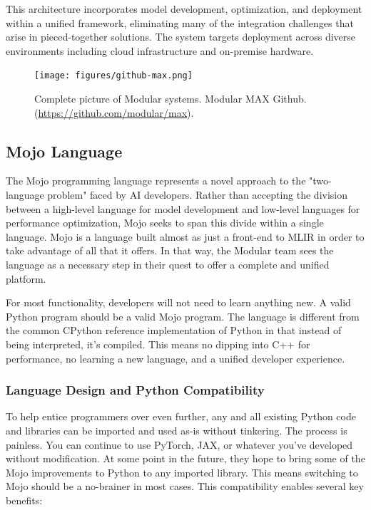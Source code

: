 \documentclass[manuscript,screen,review,format=acmsmall]{acmart}
\begin{document}
This architecture incorporates model development, optimization, and deployment within a unified framework, eliminating many of the integration challenges that arise in pieced-together solutions. The system targets deployment across diverse environments including cloud infrastructure and on-premise hardware.

\begin{figure}[h]
  \centering
  \texttt{[image: figures/github-max.png]}
  \caption{Complete picture of Modular systems.
    Modular MAX Github. (\url{https://github.com/modular/max}).}
  \label{figure:maxgood}
\end{figure}

\subsection{Mojo Language}

The Mojo programming language represents a novel approach to the "two-language problem" faced by AI developers. Rather than accepting the division between a high-level language for model development and low-level languages for performance optimization, Mojo seeks to span this divide within a single language. Mojo is a language built almost as just a front-end to MLIR in order to take advantage of all that it offers. In that way, the Modular team sees the language as a necessary step in their quest to offer a complete and unified platform.

For most functionality, developers will not need to learn anything new. A valid Python program should be a valid Mojo program. The language is different from the common CPython reference implementation of Python in that instead of being interpreted, it’s compiled. This means no dipping into C++ for performance, no learning a new language, and a unified developer experience.

\subsubsection{Language Design and Python Compatibility}

To help entice programmers over even further, any and all existing Python code and libraries can be imported and used as-is without tinkering. The process is painless. You can continue to use PyTorch, JAX, or whatever you’ve developed without modification. At some point in the future, they hope to bring some of the Mojo improvements to Python to any imported library. This means switching to Mojo should be a no-brainer in most cases. This compatibility enables several key benefits:
\end{document}
